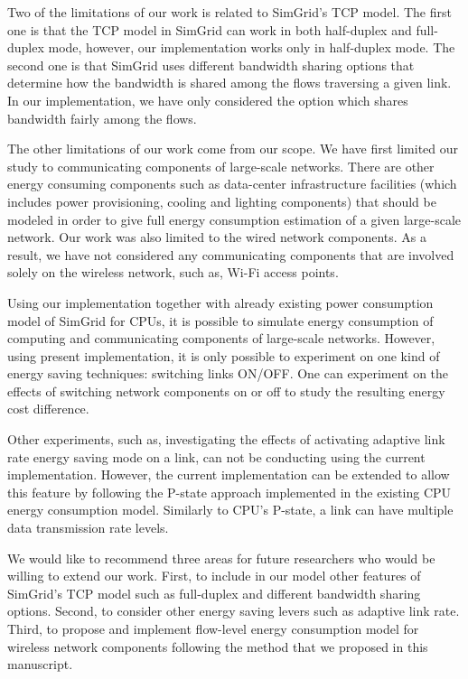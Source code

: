 Two of the limitations of our work is related to SimGrid's TCP model. The first one is that the TCP model in SimGrid can work in both half-duplex and full-duplex mode, however, our implementation works only in half-duplex mode. The second one  is that SimGrid uses different bandwidth sharing options that determine how the bandwidth is shared among the flows traversing a given link. In our implementation, we have only considered the option which shares bandwidth fairly among the flows. 

The other limitations of our work come from our scope. We have first limited our study to communicating components of large-scale networks. There are other energy consuming components such as data-center infrastructure facilities (which includes power provisioning, cooling and lighting components) that should be modeled in order to give full energy consumption estimation of a given large-scale network. Our work was also limited to the wired network components. As a result, we have not considered any communicating components that are involved solely on the wireless network, such as, Wi-Fi access points. 

Using our implementation together with already existing power consumption model of SimGrid for CPUs, it is possible to simulate energy consumption of computing and communicating components of large-scale networks. However, using present implementation, it is only possible to experiment on one kind of energy saving techniques: switching links ON/OFF. One can experiment on the effects of switching network components on or off to study the resulting energy cost difference. 

Other experiments, such as, investigating the effects of activating adaptive link rate energy saving mode on a link, can not be conducting using the current implementation. However, the current implementation can be extended to allow this feature by following the P-state approach implemented in the existing CPU energy consumption model. Similarly to CPU's P-state, a link can have multiple data transmission rate levels. 

We would like to recommend three areas for future researchers who would be willing to extend our work. First, to include in our model other features of SimGrid's TCP model such as full-duplex and different bandwidth sharing options.  Second, to consider other energy saving levers such as adaptive link rate. Third, to propose and implement flow-level energy consumption model for wireless network components following the method that we proposed in this manuscript. 
